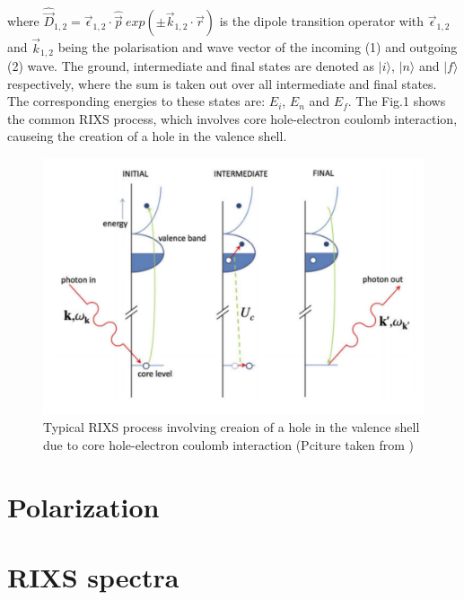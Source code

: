 \documentclass[twoside,twocolumn, elsart]{article}
\begin{document}
\noindent where $\hat{\vec{D}}_{1,2} = \vec{\epsilon}_{1,2}\cdot\hat{\vec{p}}~exp(\pm \vec{k}_{1,2} \cdot \vec{r})$ is the dipole transition operator with $\vec{\epsilon}_{1,2}$ and $\vec{k}_{1,2}$ being the polarisation and wave vector of the incoming (1) and outgoing (2) wave. The ground, intermediate and final states are denoted as $|i\rangle$, $|n\rangle$ and $|f\rangle$ respectively, where the sum is taken out over all intermediate and final states. The corresponding energies to these states are: $E_i$, $E_n$ and $E_f$. The Fig.1 shows the common RIXS process, which involves core hole-electron coulomb interaction, causeing the creation of a hole in the valence shell.

\begin{figure}
    \begin{minipage}[b]{\columnwidth}
	\includegraphics[width=\textwidth]{RIXSprocess.pdf}
	\caption{Typical RIXS process involving creaion of a hole in the valence shell due to core hole-electron coulomb interaction \cite{GuarisePhD} (Pciture taken from \cite{GuarisePhD})}
	\label{fig: RIXSprocess}
    \end{minipage}
\end{figure}
\section{Polarization}

\section{RIXS spectra}
\end{document}
